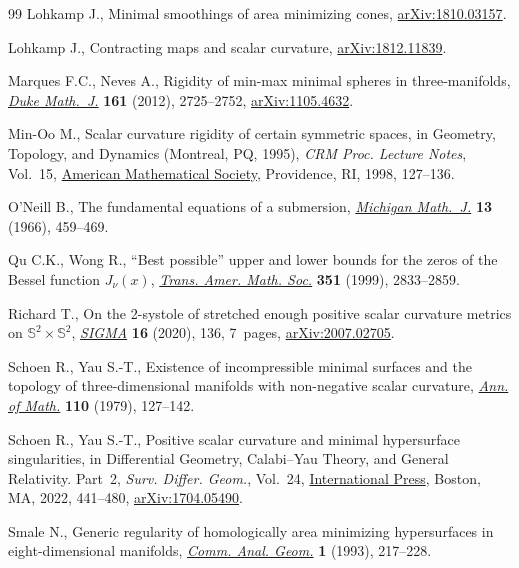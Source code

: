 \begin{thebibliography}{99}
Lohkamp J., Minimal smoothings of area minimizing cones, \href{https://arxiv.org/abs/1810.03157}{arXiv:1810.03157}.

Lohkamp J., Contracting maps and scalar curvature, \href{https://arxiv.org/abs/1812.11839}{arXiv:1812.11839}.

Marques F.C., Neves A., Rigidity of min-max minimal spheres in three-manifolds,
  \href{https://doi.org/10.1215/00127094-1813410}{\textit{Duke Math.~J.}} \textbf{161} (2012), 2725--2752, \href{https://arxiv.org/abs/1105.4632}{arXiv:1105.4632}.

Min-Oo M., Scalar curvature rigidity of certain symmetric spaces, in Geometry,
  {T}opology, and {D}ynamics ({M}ontreal, {PQ}, 1995), \textit{CRM Proc.
  Lecture Notes}, Vol.~15, \href{https://doi.org/10.1090/crmp/015/08}{American Mathematical Society}, Providence, RI, 1998,
  127--136.

O'Neill B., The fundamental equations of a submersion, \href{https://doi.org/10.1307/mmj/1028999604}{\textit{Michigan
  Math.~J.}} \textbf{13} (1966), 459--469.

Qu C.K., Wong R., ``{B}est possible'' upper and lower bounds for the zeros of
  the {B}essel function {$J_\nu(x)$}, \href{https://doi.org/10.1090/S0002-9947-99-02165-0}{\textit{Trans. Amer. Math. Soc.}}
  \textbf{351} (1999), 2833--2859.

Richard T., On the 2-systole of stretched enough positive scalar curvature
  metrics on {$\mathbb S^2\times\mathbb S^2$}, \href{https://doi.org/10.3842/SIGMA.2020.136}{\textit{SIGMA}} \textbf{16}
  (2020), 136, 7~pages, \href{https://arxiv.org/abs/2007.02705}{arXiv:2007.02705}.

Schoen R., Yau S.-T., Existence of incompressible minimal surfaces and the
  topology of three-dimensional manifolds with non-negative scalar curvature,
  \href{https://doi.org/10.2307/1971247}{\textit{Ann. of Math.}} \textbf{110} (1979), 127--142.

Schoen R., Yau S.-T., Positive scalar curvature and minimal hypersurface
  singularities, in {D}ifferential {G}eometry, {C}alabi--{Y}au {T}heory, and
  {G}eneral {R}elativity. {P}art~2, \textit{Surv. Differ. Geom.}, Vol.~24,
  \href{https://doi.org/10.4310/SDG.2019.v24.n1.a10}{International Press}, Boston, MA, 2022, 441--480, \href{https://arxiv.org/abs/1704.05490}{arXiv:1704.05490}.

Smale N., Generic regularity of homologically area minimizing hypersurfaces in
  eight-dimensional manifolds, \href{https://doi.org/10.4310/CAG.1993.v1.n2.a2}{\textit{Comm. Anal. Geom.}} \textbf{1} (1993),
  217--228.


\end{thebibliography}
